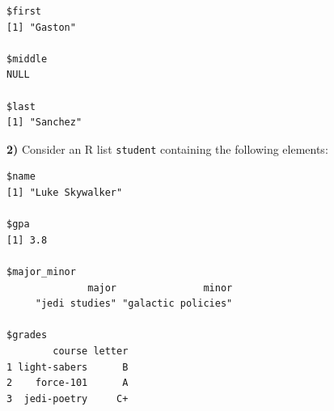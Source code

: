 \documentclass[
]{book}
\begin{document}
\begin{verbatim}
$first
[1] "Gaston"

$middle
NULL

$last
[1] "Sanchez"
\end{verbatim}

\textbf{2)} Consider an R list \texttt{student} containing the following elements:

\begin{verbatim}
$name
[1] "Luke Skywalker"

$gpa
[1] 3.8

$major_minor
              major               minor 
     "jedi studies" "galactic policies" 

$grades
        course letter
1 light-sabers      B
2    force-101      A
3  jedi-poetry     C+
\end{verbatim}
\end{document}
